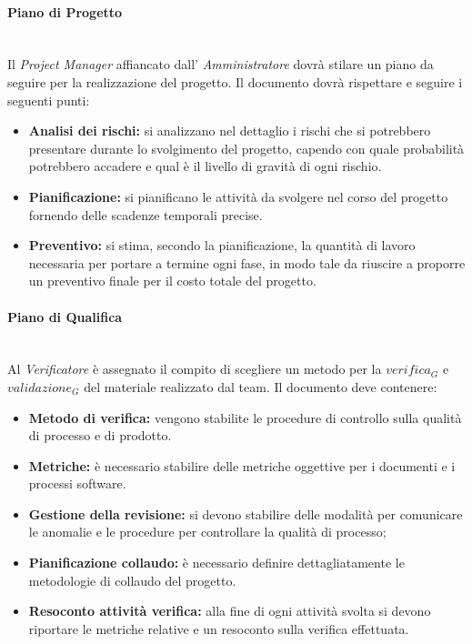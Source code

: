 		\paragraph{Piano di Progetto} \mbox{} \\
		Il \emph{Project Manager} affiancato dall' \emph{Amministratore} dovrà stilare un piano da seguire per la realizzazione del progetto.
		Il documento dovrà rispettare e seguire i seguenti punti:
		\begin{itemize}
		\item \textbf{Analisi dei rischi:} si analizzano nel dettaglio i rischi che si potrebbero presentare durante lo svolgimento del progetto, capendo con quale probabilità potrebbero accadere e qual è il livello di gravità di ogni rischio.
		\item \textbf{Pianificazione:} si pianificano le attività da svolgere nel corso del progetto fornendo delle scadenze temporali precise.
		\item \textbf{Preventivo:} si stima, secondo la pianificazione, la quantità di lavoro necessaria per portare a termine ogni fase, in modo tale da riuscire a proporre un preventivo finale per il costo totale del progetto.
		\end{itemize} 
		
		\paragraph{Piano di Qualifica} \mbox{} \\
		Al \emph{Verificatore} è assegnato il compito di scegliere un metodo per la $verifica_G$ e $validazione_G$ del materiale realizzato dal team.
		Il documento deve contenere:
		\begin{itemize}
		\item \textbf{Metodo di verifica:} vengono stabilite le procedure di controllo sulla qualità di processo e di prodotto. 
		\item \textbf{Metriche:} è necessario stabilire delle metriche oggettive per i documenti e i processi software.
		\item \textbf{Gestione della revisione:} si devono stabilire delle modalità per comunicare le anomalie e le procedure per controllare la qualità di processo;
		\item \textbf{Pianificazione collaudo:} è necessario definire dettagliatamente le metodologie di collaudo del progetto.
		\item \textbf{Resoconto attività verifica:} alla fine di ogni attività svolta si devono riportare le metriche relative e un resoconto sulla verifica effettuata.
		\end{itemize}
	
